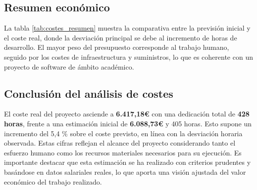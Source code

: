 \subsection{Resumen económico}

\begin{table}[H]
  \centering
  \caption{Desglose de costes estimados y reales del proyecto}
  \label{tab:costes_resumen}
\end{table}

La tabla \ref{tab:costes_resumen} muestra la comparativa entre la previsión inicial y el coste real, donde la desviación principal se debe al incremento de horas de desarrollo. El mayor peso del presupuesto corresponde al trabajo humano, seguido por los costes de infraestructura y suministros, lo que es coherente con un proyecto de software de ámbito académico.


\subsection{Conclusión del análisis de costes}

El coste real del proyecto asciende a \textbf{6.417,18\euro} con una dedicación total de \textbf{428 horas}, frente a una estimación inicial de \textbf{6.088,73\euro} y 405 horas. Esto supone un incremento del 5,4 \% sobre el coste previsto, en línea con la desviación horaria observada. Estas cifras reflejan el alcance del proyecto considerando tanto el esfuerzo humano como los recursos materiales necesarios para su ejecución. Es importante destacar que esta estimación se ha realizado con criterios prudentes y basándose en datos salariales reales, lo que aporta una visión ajustada del valor económico del trabajo realizado.
